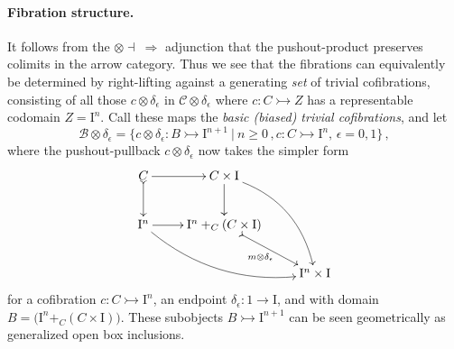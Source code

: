 \documentclass[11pt]{article}
\newcommand{\mono}{\ensuremath{\rightarrowtail}}
\newcommand{\I}{\ensuremath{\mathrm{I}}}
\theoremstyle{remark}
\theoremstyle{definition}
\begin{document}
\paragraph{Fibration structure.}
It follows from the $\otimes\dashv\ \Rightarrow$ adjunction that the pushout-product preserves colimits in the arrow category.  Thus we see that the fibrations can equivalently be determined by right-lifting against a generating \emph{set} of trivial cofibrations, consisting of all those $c \otimes \delta_\epsilon$ in $\mathcal{C}\otimes \delta_\epsilon$ where $c : C \mono Z$ has a representable codomain $Z=\I^n$.  Call these maps the \emph{basic (biased) trivial cofibrations}, and let 
\begin{equation}\label{eq:basictrivcof}
\mathcal{B}\otimes \delta_\epsilon = \{c \otimes \delta_\epsilon : B \mono \I^{n+1}\ |\ n\geq 0\,, c : C\mono \I^n,\,\epsilon = 0,1\}\,,
\end{equation}
where the pushout-pullback $c\otimes\delta_\epsilon$ now takes the simpler form
\begin{equation}\label{diagram:basicpushoutproduct}
\xymatrix{
C \ar@{>->}[d] \ar[r] & C\times \I \ar[d] \ar@/^4ex/ [rdd]\\
\I^{n} \ar@/_4ex/ [rrd] \ar[r] &  \I^n +_C (C\times\I) \ar@{>->}[rd]_{m \otimes \delta_\epsilon} \\
&& \I^{n}\times\I
}
\end{equation}
for a cofibration $c : C\mono \I^n$, an endpoint $\delta_\epsilon:1 \to \I$, and with domain $B = \big(\I^n +_C (C\times\I)\big)$.   These subobjects $B \mono \I^{n+1}$ can be seen geometrically as generalized open box inclusions.
\end{document}
